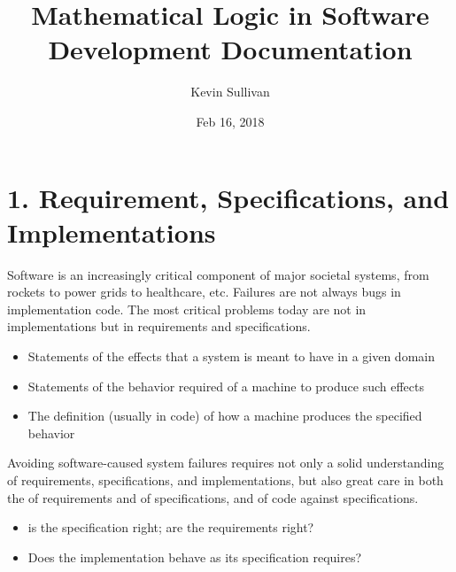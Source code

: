 \documentclass[letterpaper,10pt,english]{sphinxmanual}
\title{Mathematical Logic in Software Development Documentation}
\date{Feb 16, 2018}
\author{Kevin Sullivan}
\begin{document}
\maketitle
\sphinxtableofcontents
{}\label{\detokenize{index::doc}}



\chapter{1. Requirement, Specifications, and Implementations}
\label{\detokenize{01-reqs-specs-impls:welcome-to-mathematical-logic-in-software-development}}\label{\detokenize{01-reqs-specs-impls::doc}}\label{\detokenize{01-reqs-specs-impls:requirement-specifications-and-implementations}}
Software is an increasingly critical component of major societal
systems, from rockets to power grids to healthcare, etc. Failures are
not always bugs in implementation code. The most critical problems
today are not in implementations but in requirements and
specifications.
\begin{itemize}
\item {} 
 Statements of the effects that a system is meant to have in a given domain

\item {} 
 Statements of the behavior required of a machine to produce such effects

\item {} 
 The definition (usually in code) of how a machine produces the specified behavior

\end{itemize}

Avoiding software-caused system failures requires not only a solid
understanding of requirements, specifications, and implementations,
but also great care in both the  of requirements and of
specifications, and  of code against specifications.
\begin{itemize}
\item {} 
  is the specification right; are the requirements right?

\item {} 
  Does the implementation behave as its specification requires?

\end{itemize}
\end{document}
